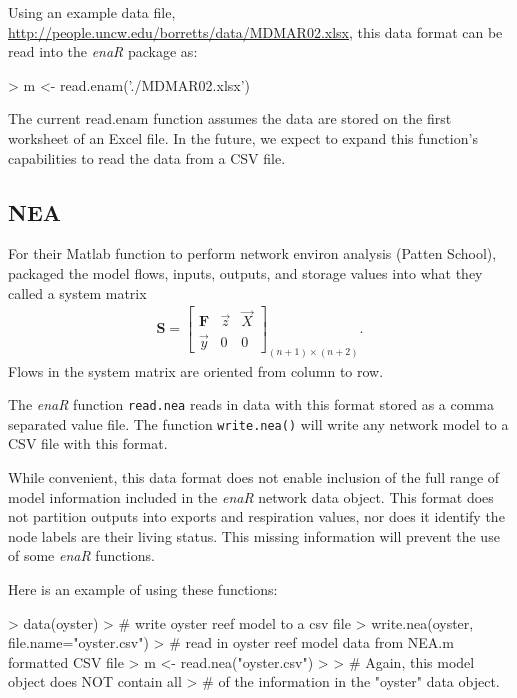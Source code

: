 \documentclass[article]{jss}
\begin{document}
Using an example data file,
\url{http://people.uncw.edu/borretts/data/MDMAR02.xlsx}, this data
format can be read into the \textit{enaR} package as:

\begin{Schunk}
\begin{Sinput}
>   m <- read.enam('./MDMAR02.xlsx')
\end{Sinput}
\end{Schunk}

The current read.enam function assumes the data are stored on the
first worksheet of an Excel file. In the future, we expect to expand
this function's capabilities to read the data from a CSV file.

\subsection*{NEA}

For their Matlab function to perform network environ analysis (Patten School),
\citet{fath06} packaged the model flows, inputs, outputs, and storage
values into what they called a system matrix
\begin{align}
\mathbf{S} = \left[ \begin{array}{ccc} \mathbf{F} & \vec{z} & \vec{X} \\
     \vec{y}  &  0 & 0 \end{array}
\right]_{(n+1) \times (n+2)}.
\end{align}
Flows in the system matrix are oriented from column to row.

The \textit{enaR} function \texttt{read.nea} reads in data with this
format stored as a comma separated value file.  The function
\texttt{write.nea()} will write any network model to a CSV file with
this format.

While convenient, this data format does not enable inclusion of the
full range of model information included in the \textit{enaR} network
data object.  This format does not partition outputs into exports and
respiration values, nor does it identify the node labels are their
living status. This missing information will prevent the use of some
\textit{enaR} functions.

Here is an example of using these functions:
\begin{Schunk}
\begin{Sinput}
> data(oyster)
> # write oyster reef model to a csv file
> write.nea(oyster, file.name="oyster.csv")
> # read in oyster reef model data from NEA.m formatted CSV file
> m <- read.nea("oyster.csv")
> 
> # Again, this model object does NOT contain all
> # of the information in the "oyster" data object.
\end{Sinput}
\end{Schunk}
\end{document}
